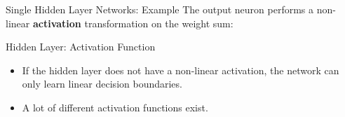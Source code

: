 \begin{frame} {Single Hidden Layer Networks: Example}
The output neuron performs a non-linear \textbf{activation} transformation on the weight sum:
\begin{figure}
\centering
{}
\end{figure}
\end{frame}
\begin{frame} {Hidden Layer: Activation Function}
\begin{itemize}
\item If the hidden layer does not have a non-linear activation, the network can only learn linear decision boundaries.
\item A lot of different activation functions exist.
 \end{itemize}
\end{frame}



